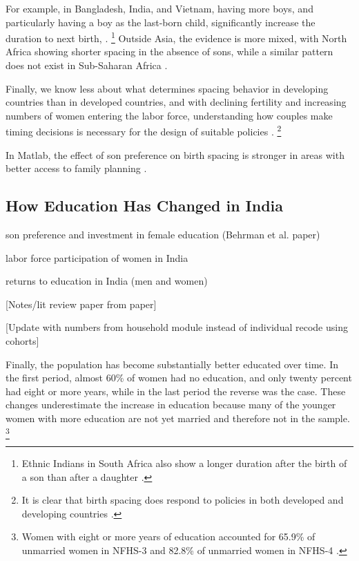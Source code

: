 For example, in Bangladesh, India, and Vietnam, having more boys, and particularly having 
a boy as the last-born child, significantly increase the duration to next birth,
\citep{Haughton1995,Haughton1996,Rahman1993,Bhalotra2008,Kumar2016,Soest2018}.%
\footnote{
Ethnic Indians in South Africa also show a longer duration after the birth of a 
son than after a daughter \citep{Gangadharan2003}.
}
Outside Asia, the evidence is more mixed, with North Africa showing shorter spacing in the 
absence of sons, while a similar pattern does not exist in Sub-Saharan Africa 
\citep{Rossi2015}.


Finally, we know less about what determines spacing behavior in developing countries than 
in developed countries, and with declining fertility and increasing numbers of women 
entering the labor force, understanding how couples make timing decisions is necessary 
for the design of suitable policies \citep{Portner2018}.%
\footnote{
It is clear that birth spacing does respond to policies in both developed and 
developing countries \citep{Pettersson-Lidbom2009,Todd2012,Meckel2015,Ghosh2018}.
}


In Matlab, the effect of son preference on birth spacing is stronger in areas with better 
access to family planning \citep{Rahman1993}.


\subsection{How Education Has Changed in India}

son preference and investment in female education (Behrman et al. paper)

labor force participation of women in India

returns to education in India (men and women)

[Notes/lit review paper from paper]

[Update with numbers from household module instead of individual recode using cohorts]

Finally, the population has become substantially better educated over time.
In the first period, almost 60\% of women had no education, and only twenty percent had
eight or more years, while in the last period the reverse was the case.
These changes underestimate the increase in education because many of the younger women 
with more education are not yet married and therefore not in the sample.%
\footnote{
Women with eight or more years of education accounted for 65.9\% of
unmarried women in NFHS-3 and 82.8\% of unmarried women in NFHS-4
\citep{International-Institute-for-Population-Sciences-IIPS2007,International-Institute-for-Population-Sciences-IIPS2017}.
}

